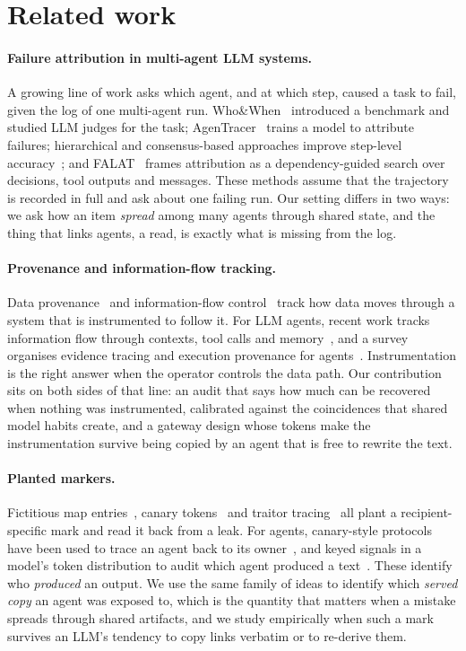\section{Related work}\label{sec:related}

\paragraph{Failure attribution in multi-agent LLM systems.}
A growing line of work asks which agent, and at which step, caused a task to fail, given the log of one multi-agent run. Who\&When~\citep{zhang2025which} introduced a benchmark and studied LLM judges for the task; AgenTracer~\citep{zhang2025agentracer} trains a model to attribute failures; hierarchical and consensus-based approaches improve step-level accuracy~\citep{banerjee2025where}; and FALAT~\citep{rafi2026falat} frames attribution as a dependency-guided search over decisions, tool outputs and messages. These methods assume that the trajectory is recorded in full and ask about one failing run. Our setting differs in two ways: we ask how an item \emph{spread} among many agents through shared state, and the thing that links agents, a read, is exactly what is missing from the log.

\paragraph{Provenance and information-flow tracking.}
Data provenance~\citep{buneman2001why} and information-flow control~\citep{denning1976lattice,enck2010taintdroid} track how data moves through a system that is instrumented to follow it. For LLM agents, recent work tracks information flow through contexts, tool calls and memory~\citep{cai2026ghost}, and a survey organises evidence tracing and execution provenance for agents~\citep{wang2026traces}. Instrumentation is the right answer when the operator controls the data path. Our contribution sits on both sides of that line: an audit that says how much can be recovered when nothing was instrumented, calibrated against the coincidences that shared model habits create, and a gateway design whose tokens make the instrumentation survive being copied by an agent that is free to rewrite the text.

\paragraph{Planted markers.}
Fictitious map entries~\citep{fictitiousentry}, canary tokens~\citep{canarytokens} and traitor tracing~\citep{chor1994tracing} all plant a recipient-specific mark and read it back from a leak. For agents, canary-style protocols have been used to trace an agent back to its owner~\citep{chocron2026owns}, and keyed signals in a model's token distribution to audit which agent produced a text~\citep{nian2026final}. These identify who \emph{produced} an output. We use the same family of ideas to identify which \emph{served copy} an agent was exposed to, which is the quantity that matters when a mistake spreads through shared artifacts, and we study empirically when such a mark survives an LLM's tendency to copy links verbatim or to re-derive them.

